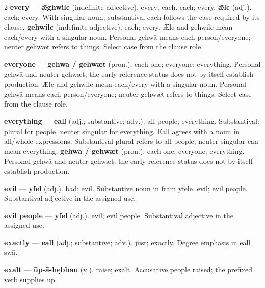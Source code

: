 \begin{multicols}{2}
\textbf{every} — \textbf{ǣghwilc} (indefinite adjective). every; each. each; every. \textbf{ǣlc} (adj.). each; every. With singular noun; substantival each follows the case required by its clause. \textbf{gehwilc} (indefinite adjective). each; every. Ǣlc and gehwilc mean each/every with a singular noun. Personal gehwā means each person/everyone; neuter gehwæt refers to things. Select case from the clause role.\par
\textbf{everyone} — \textbf{gehwā / gehwæt} (pron.). each one; everyone; everything. Personal gehwā and neuter gehwæt; the early reference status does not by itself establish production. Ǣlc and gehwilc mean each/every with a singular noun. Personal gehwā means each person/everyone; neuter gehwæt refers to things. Select case from the clause role.\par
\textbf{everything} — \textbf{eall} (adj.; substantive; adv.). all people; everything. Substantival: plural for people, neuter singular for everything. Eall agrees with a noun in all/whole expressions. Substantival plural refers to all people; neuter singular can mean everything. \textbf{gehwā / gehwæt} (pron.). each one; everyone; everything. Personal gehwā and neuter gehwæt; the early reference status does not by itself establish production.\par
\textbf{evil} — \textbf{yfel} (adj.). bad; evil. Substantive noun in fram yfele. evil; evil people. Substantival adjective in the assigned use.\par
\textbf{evil people} — \textbf{yfel} (adj.). evil; evil people. Substantival adjective in the assigned use.\par
\textbf{exactly} — \textbf{eall} (adj.; substantive; adv.). just; exactly. Degree emphasis in eall swā.\par
\textbf{exalt} — \textbf{ūp-ā-hębban} (v.). raise; exalt. Accusative people raised; the prefixed verb supplies up.\par

\end{multicols}
